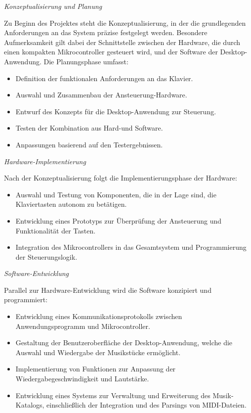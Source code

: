 \textit{Konzeptualisierung und Planung}

Zu Beginn des Projektes steht die Konzeptualisierung, in der die grundlegenden Anforderungen an das System präzise festgelegt werden.
Besondere Aufmerksamkeit gilt dabei der Schnittstelle zwischen der Hardware, die durch einen kompakten Mikrocontroller gesteuert wird,
und der Software der Desktop-Anwendung.
Die Planungsphase umfasst:

\begin{itemize}
    \item Definition der funktionalen Anforderungen an das Klavier.
    \item Auswahl und Zusammenbau der Ansteuerung-Hardware.
    \item Entwurf des Konzepts für die Desktop-Anwendung zur Steuerung.
    \item Testen der Kombination aus Hard-und Software.
    \item Anpassungen basierend auf den Testergebnissen.
\end{itemize}

\textit{Hardware-Implementierung}

Nach der Konzeptualisierung folgt die Implementierungsphase der Hardware:

\begin{itemize}
    \item Auswahl und Testung von Komponenten, die in der Lage sind, die Klaviertasten autonom zu betätigen.
    \item Entwicklung eines Prototyps zur Überprüfung der Ansteuerung und Funktionalität der Tasten.
    \item Integration des Mikrocontrollers in das Gesamtsystem und Programmierung der Steuerungslogik.
\end{itemize}

\textit{Software-Entwicklung}

Parallel zur Hardware-Entwicklung wird die Software konzipiert und programmiert:

\begin{itemize}
    \item Entwicklung eines Kommunikationsprotokolls zwischen Anwendungsprogramm und Mikrocontroller.
    \item Gestaltung der Benutzeroberfläche der Desktop-Anwendung, welche die Auswahl und Wiedergabe der Musikstücke ermöglicht.
    \item Implementierung von Funktionen zur Anpassung der Wiedergabegeschwindigkeit und Lautstärke.
    \item Entwicklung eines Systems zur Verwaltung und Erweiterung des Musik-Katalogs, einschließlich der Integration und des Parsings von MIDI-Dateien.
\end{itemize}

